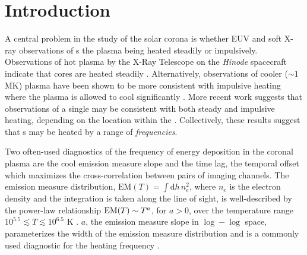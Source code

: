 \section{Introduction}\label{sec:introduction}

A central problem in the study of the solar corona is whether EUV and soft X-ray observations of \AR s  the plasma being heated steadily or impulsively.
Observations of hot plasma by the X-Ray Telescope \citep[XRT,][]{golub_x-ray_2007} on the \textit{Hinode} spacecraft \citep{kosugi_hinode_2007} indicate that \AR{} cores are heated steadily \citep[e.g.][]{warren_constraints_2011,winebarger_using_2011}.
Alternatively, observations of cooler ($\sim1$ MK) plasma have been shown to be more consistent with impulsive heating where the plasma is allowed to cool significantly  \citep[e.g][]{winebarger_evolving_2003,mulu-moore_determining_2011,ugarte-urra_investigation_2006,viall_patterns_2011,viall_evidence_2012}.
More recent work \citep{del_zanna_evolution_2015,bradshaw_patterns_2016} suggests that observations of a single \AR{} may be consistent with both steady and impulsive heating, depending on the location within the \AR{}.
Collectively, these results suggest that \AR s may be heated by a range of \textit{frequencies}.

Two often-used diagnostics of the frequency of energy deposition in the coronal plasma are the cool emission measure slope and the time lag, the temporal offset which maximizes the cross-correlation between pairs of imaging channels.
The emission measure distribution, $\mathrm{EM}(T)=\int\mathrm{d}h\,n_e^2$, where $n_e$ is the electron density and the integration is taken along the line of sight, is well-described by the power-law relationship $\textup{EM}(T)\sim T^a$, for $a>0$, over the temperature range $10^{5.5}\lesssim T\lesssim10^{6.5}$ K \citep{jordan_structure_1975,jordan_structure_1976}.
$a$, the emission measure slope in $\log-\log$ space, parameterizes the width of the emission measure distribution and is a commonly used diagnostic for the heating frequency \citep[e.g.][]{tripathi_emission_2011,winebarger_using_2011,warren_constraints_2011,mulu-moore_can_2011,bradshaw_diagnosing_2012,schmelz_cold_2012,reep_diagnosing_2013,del_zanna_evolution_2015}.

